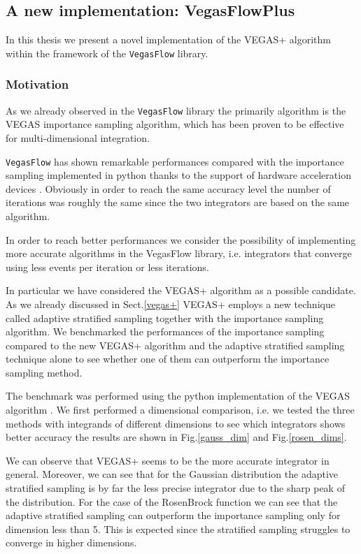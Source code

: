 \documentclass[../main/main.tex]{subfiles}
\begin{document}
 
 
 
 
\subsection{A new implementation: VegasFlowPlus}
In this thesis we present a novel implementation of the VEGAS+ algorithm within the framework of the \texttt{VegasFlow} library.
\subsubsection{Motivation}
As we already observed in the \texttt{VegasFlow} library the primarily algorithm is the VEGAS importance sampling algorithm, which has been proven to be effective for multi-dimensional integration.

\texttt{VegasFlow} has shown remarkable performances compared with the importance sampling  implemented in python \cite{peter_lepage_2021_4746454} thanks to the support of hardware acceleration devices . Obviously in order to reach the same accuracy level the number of iterations was roughly the same since the two integrators are based on the same algorithm.

In order to reach better performances we consider the possibility of implementing more accurate algorithms in the VegasFlow library, i.e. integrators that converge using less events per iteration or less iterations. 

In particular we have considered the VEGAS+ algorithm as a possible candidate. 
As we already discussed in Sect.\ref{vegas+} VEGAS+ employs a new technique called adaptive stratified sampling together with the importance sampling algorithm. 
We benchmarked the performances of the importance sampling compared to the new VEGAS+ algorithm and the adaptive stratified sampling technique alone to see whether one of them can outperform the importance sampling method.

The benchmark was performed using the python implementation of the VEGAS algorithm \cite{peter_lepage_2021_4746454}.
We first performed a dimensional comparison, i.e. we tested the three methods with integrands of different dimensions to see which integrators shows better accuracy the results are shown in Fig.\ref{gauss_dim} and Fig.\ref{rosen_dims}.


We can observe that VEGAS+ seems to be the more accurate integrator in general. Moreover, we can see that for the Gaussian distribution the adaptive stratified sampling is by far the less precise integrator due to the sharp peak of the distribution. For the case of the RosenBrock function we can see that the adaptive stratified sampling can outperform the importance sampling only for dimension less than 5. This is expected since the stratified sampling struggles to converge in higher dimensions.
\end{document}
